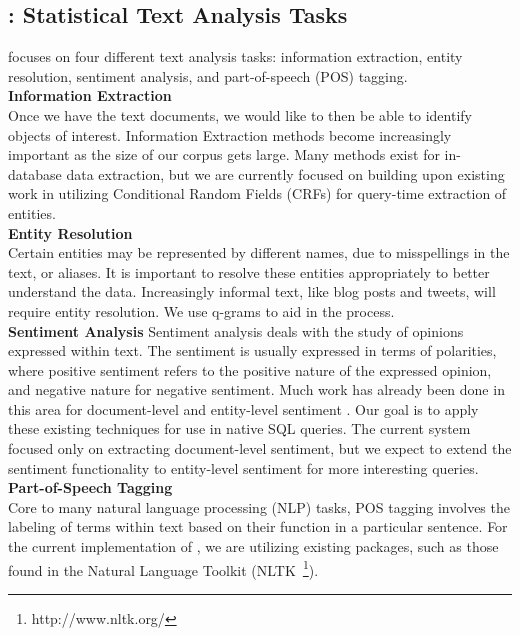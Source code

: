 \subsection{{\system}: Statistical Text Analysis Tasks}
{\system} focuses on four different text analysis tasks: 
information extraction, entity resolution,
sentiment analysis, and part-of-speech (POS) tagging.\\

\noindent
\textbf{Information Extraction}\\
Once we have the text documents, we would like to then be able to identify 
objects of interest. Information Extraction methods become increasingly
important as the size of our corpus gets large. Many methods exist for in-database data
extraction, but we are currently focused on building upon existing work in 
utilizing Conditional Random Fields (CRFs) for query-time extraction of 
entities\cite{wang2011hybrid}.\\

\noindent
\textbf{Entity Resolution}\\
Certain entities may be represented by
different names, due to misspellings in the text, or aliases. It is important to
resolve these entities appropriately to better understand the data. Increasingly
informal text, like blog posts and tweets, will require entity resolution. We
use q-grams to aid in the process. 
\\

\noindent
\textbf{Sentiment Analysis}
Sentiment analysis deals with the study of opinions expressed within text. 
The sentiment is usually expressed in terms of polarities, where positive
sentiment refers to the positive nature of the expressed opinion, and negative
nature for negative sentiment. Much work has already been done in this
area for document-level and entity-level sentiment \cite{zhang2011combining, 
o2010tweets}. Our goal is to apply these existing techniques for use in 
native SQL queries. The current {\system} system focused only on extracting
document-level sentiment, but we expect to extend the sentiment functionality to 
entity-level sentiment for more interesting queries.\\

\noindent
\textbf{Part-of-Speech Tagging}\\
Core to many natural language processing (NLP) tasks, POS tagging
involves the labeling of terms within text based on their function in a
particular sentence. For the current implementation of {\system}, we are 
utilizing existing packages, such as those found in the Natural Language 
Toolkit (NLTK~\footnote{http://www.nltk.org/}).

